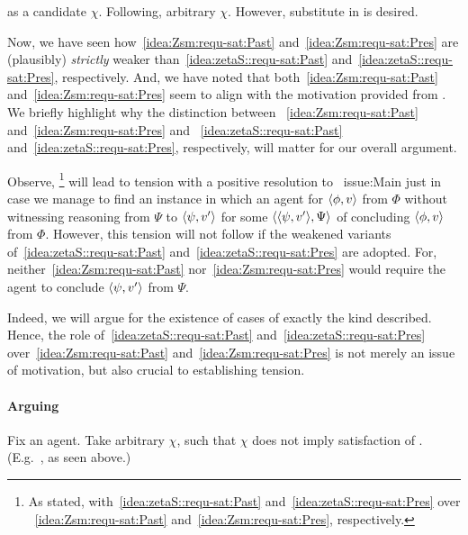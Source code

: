 \begin{note}
  \izetaSm{} as a candidate \(\chi\).
  {
    \color{red}
    Following, arbitrary \(\chi\).
    However, substitute in \izetaSm{} is desired.
  }
\end{note}

\begin{note}
  Now, we have seen how~\ref{idea:Zsm:requ-sat:Past} and~\ref{idea:Zsm:requ-sat:Pres} are (plausibly) \emph{strictly} weaker than~\ref{idea:zetaS::requ-sat:Past} and~\ref{idea:zetaS::requ-sat:Pres}, respectively.
  And, we have noted that both~\ref{idea:Zsm:requ-sat:Past} and~\ref{idea:Zsm:requ-sat:Pres} seem to align with the motivation provided from \csN{}.
  We briefly highlight why the distinction between ~\ref{idea:Zsm:requ-sat:Past} and~\ref{idea:Zsm:requ-sat:Pres} and ~\ref{idea:zetaS::requ-sat:Past} and~\ref{idea:zetaS::requ-sat:Pres}, respectively, will matter for our overall argument.

  Observe, \csN{}%
  \footnote{
    As stated, with~\ref{idea:zetaS::requ-sat:Past} and~\ref{idea:zetaS::requ-sat:Pres} over ~\ref{idea:Zsm:requ-sat:Past} and~\ref{idea:Zsm:requ-sat:Pres}, respectively.
  }
  will lead to tension with a positive resolution to~{\color{red} issue:Main} just in case we manage to find an instance in which an agent \csN{} for \(\langle \phi, v \rangle\) from \(\Phi\) without witnessing reasoning from \(\Psi\) to \(\langle \psi, v' \rangle\) for some \requ{} \(\langle \langle \psi, v' \rangle, \Psi \rangle\) of concluding \(\langle \phi, v \rangle\) from \(\Phi\).
  However, this tension will not follow if the weakened variants of~\ref{idea:zetaS::requ-sat:Past} and~\ref{idea:zetaS::requ-sat:Pres} are adopted.
  For, neither~\ref{idea:Zsm:requ-sat:Past} nor~\ref{idea:Zsm:requ-sat:Pres} would require the agent to conclude \(\langle \psi, v' \rangle\) from \(\Psi\).

  Indeed, we will argue for the existence of cases of exactly the kind described.
  Hence, the role of~\ref{idea:zetaS::requ-sat:Past} and~\ref{idea:zetaS::requ-sat:Pres} over~\ref{idea:Zsm:requ-sat:Past} and~\ref{idea:Zsm:requ-sat:Pres} is not merely an issue of motivation, but also crucial to establishing tension.
\end{note}

\paragraph*{Arguing}

\begin{note}
  Fix an agent.
  Take arbitrary \(\chi\), such that \(\chi\) does not imply satisfaction of \izetaS{}.
  (E.g.\ \izetaSm{}, as seen above.)
\end{note}


